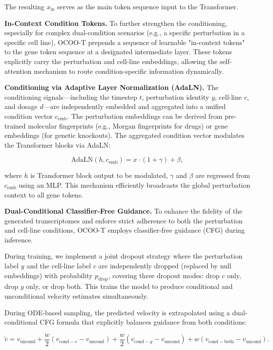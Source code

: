 \documentclass[11pt]{article}
\begin{document}
The resulting $x_{\mathrm{in}}$ serves as the main token sequence input to the Transformer.

\textbf{In-Context Condition Tokens.} To further strengthen the conditioning, especially for complex dual-condition scenarios (e.g., a specific perturbation in a specific cell line), OCOO-T prepends a sequence of learnable "in-context tokens" to the gene token sequence at a designated intermediate layer. These tokens explicitly carry the perturbation and cell-line embeddings, allowing the self-attention mechanism to route condition-specific information dynamically.

\textbf{Conditioning via Adaptive Layer Normalization (AdaLN).} The conditioning signals---including the timestep $t$, perturbation identity $y$, cell-line $c$, and dosage $d$---are independently embedded and aggregated into a unified condition vector $c_{\mathrm{emb}}$. The perturbation embeddings can be derived from pre-trained molecular fingerprints (e.g., Morgan fingerprints for drugs) or gene embeddings (for genetic knockouts). The aggregated condition vector modulates the Transformer blocks via AdaLN:

\begin{equation}
  \mathrm{AdaLN}(h, c_{\mathrm{emb}}) = x \cdot (1 + \gamma) + \beta,
\end{equation}

where $h$ is Transformer block output to be modulated,  $\gamma$ and $\beta$ are regressed from $c_{\mathrm{emb}}$ using an MLP. This mechanism efficiently broadcasts the global perturbation context to all gene tokens.

\textbf{Dual-Conditional Classifier-Free Guidance.}
To enhance the fidelity of the generated transcriptomes and enforce strict adherence to both the perturbation and cell-line conditions, OCOO-T employs classifier-free guidance (CFG) during inference.

During training, we implement a joint dropout strategy where the perturbation label $y$ and the cell-line label $c$ are independently dropped (replaced by null embeddings) with probability $p_{\mathrm{drop}}$, covering three dropout modes: drop $c$ only, drop $y$ only, or drop both. This trains the model to produce conditional and unconditional velocity estimates simultaneously.

During ODE-based sampling, the predicted velocity is extrapolated using a dual-conditional CFG formula that explicitly balances guidance from both conditions:

\begin{equation}
  \tilde{v} = v_{\mathrm{uncond}} + \frac{w}{2}\left(v_{\mathrm{cond-}c} - v_{\mathrm{uncond}}\right) + \frac{w}{2}\left(v_{\mathrm{cond-}y} - v_{\mathrm{uncond}}\right) + w\left(v_{\mathrm{cond-both}} - v_{\mathrm{uncond}}\right).
\end{equation}
\end{document}
